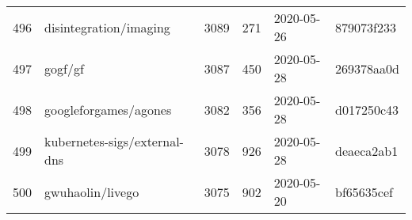\begin{longtable}{llrrll}
    496 &                             disintegration/imaging &   3089 &    271 & 2020-05-26 &  879073f233 \\
    497 &                                            gogf/gf &   3087 &    450 & 2020-05-28 &  269378aa0d \\
    498 &                              googleforgames/agones &   3082 &    356 & 2020-05-28 &  d017250c43 \\
    499 &                       kubernetes-sigs/external-dns &   3078 &    926 & 2020-05-28 &  deaeca2ab1 \\
    500 &                                   gwuhaolin/livego &   3075 &    902 & 2020-05-20 &  bf65635cef \\
    \bottomrule
\end{longtable}
